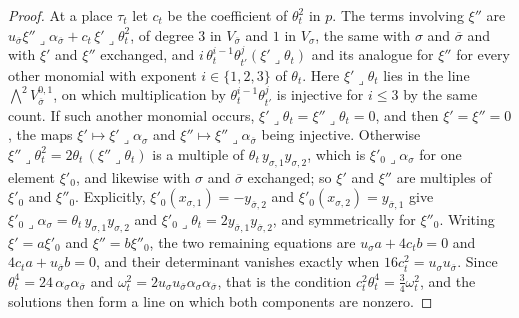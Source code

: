 \documentclass[11pt,reqno]{amsart}
\theoremstyle{plain}
\theoremstyle{definition}
\theoremstyle{remark}
\newcommand{\bbar}[1]{\overline{#1}}
\begin{document}
\begin{proof}
At a place $\tau_{t}$ let $c_{t}$ be the coefficient of $\theta_{t}^{2}$ in $p$.
The terms involving $\xi''$ are $u_{\bbar\sigma}\xi''\lrcorner
\alpha_{\bbar\sigma}+c_{t}\,\xi'\lrcorner\theta_{t}^{2}$, of degree $3$ in
$V_{\bbar\sigma}$ and $1$ in $V_{\sigma}$, the same with $\sigma$ and
$\bbar\sigma$ and with $\xi'$ and $\xi''$ exchanged, and
$i\,\theta_{t}^{i-1}\theta_{t'}^{j}(\xi'\lrcorner\theta_{t})$ and its analogue
for $\xi''$ for every other monomial with exponent $i\in\{1,2,3\}$ of
$\theta_{t}$. Here $\xi'\lrcorner\theta_{t}$ lies in the line
$\bigwedge^{2}V_{\bbar\sigma}^{0,1}$, on which multiplication by
$\theta_{t}^{i-1}\theta_{t'}^{j}$ is injective for $i\le3$ by the same count. If
such another monomial occurs, $\xi'\lrcorner\theta_{t}=\xi''\lrcorner
\theta_{t}=0$, and then $\xi'=\xi''=0$, the maps $\xi'\mapsto
\xi'\lrcorner\alpha_{\sigma}$ and $\xi''\mapsto\xi''\lrcorner\alpha_{\bbar\sigma}$
being injective. Otherwise $\xi''\lrcorner\theta_{t}^{2}=2\theta_{t}\,
(\xi''\lrcorner\theta_{t})$ is a multiple of $\theta_{t}\,y_{\sigma,1}
y_{\sigma,2}$, which is $\xi'_{0}\lrcorner\alpha_{\sigma}$ for one element
$\xi'_{0}$, and likewise with $\sigma$ and $\bbar\sigma$ exchanged; so $\xi'$
and $\xi''$ are multiples of $\xi'_{0}$ and $\xi''_{0}$. Explicitly,
$\xi'_{0}(x_{\sigma,1})=-y_{\bbar\sigma,2}$ and
$\xi'_{0}(x_{\sigma,2})=y_{\bbar\sigma,1}$ give
$\xi'_{0}\lrcorner\alpha_{\sigma}=\theta_{t}\,y_{\sigma,1}y_{\sigma,2}$ and
$\xi'_{0}\lrcorner\theta_{t}=2y_{\bbar\sigma,1}y_{\bbar\sigma,2}$, and
symmetrically for $\xi''_{0}$. Writing $\xi'=a\xi'_{0}$ and
$\xi''=b\xi''_{0}$, the two remaining equations are
$u_{\sigma}a+4c_{t}b=0$ and $4c_{t}a+u_{\bbar\sigma}b=0$, and their
determinant vanishes exactly when $16c_{t}^{2}=u_{\sigma}u_{\bbar\sigma}$. Since $\theta_{t}^{4}=24\,
\alpha_{\sigma}\alpha_{\bbar\sigma}$ and $\omega_{t}^{2}=2u_{\sigma}
u_{\bbar\sigma}\alpha_{\sigma}\alpha_{\bbar\sigma}$, that is the condition
$c_{t}^{2}\theta_{t}^{4}=\frac34\omega_{t}^{2}$, and the solutions then form a
line on which both components are nonzero.


\end{proof}
\end{document}

